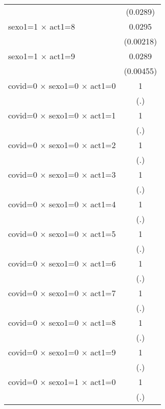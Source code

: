 {\begin{tabular}{l*{1}{c}}
                    &    (0.0289)         \\
[1em]
sexo1=1 $\times$ act1=8&      0.0295\sym{***}\\
                    &   (0.00218)         \\
[1em]
sexo1=1 $\times$ act1=9&      0.0289\sym{***}\\
                    &   (0.00455)         \\
[1em]
covid=0 $\times$ sexo1=0 $\times$ act1=0&           1         \\
                    &         (.)         \\
[1em]
covid=0 $\times$ sexo1=0 $\times$ act1=1&           1         \\
                    &         (.)         \\
[1em]
covid=0 $\times$ sexo1=0 $\times$ act1=2&           1         \\
                    &         (.)         \\
[1em]
covid=0 $\times$ sexo1=0 $\times$ act1=3&           1         \\
                    &         (.)         \\
[1em]
covid=0 $\times$ sexo1=0 $\times$ act1=4&           1         \\
                    &         (.)         \\
[1em]
covid=0 $\times$ sexo1=0 $\times$ act1=5&           1         \\
                    &         (.)         \\
[1em]
covid=0 $\times$ sexo1=0 $\times$ act1=6&           1         \\
                    &         (.)         \\
[1em]
covid=0 $\times$ sexo1=0 $\times$ act1=7&           1         \\
                    &         (.)         \\
[1em]
covid=0 $\times$ sexo1=0 $\times$ act1=8&           1         \\
                    &         (.)         \\
[1em]
covid=0 $\times$ sexo1=0 $\times$ act1=9&           1         \\
                    &         (.)         \\
[1em]
covid=0 $\times$ sexo1=1 $\times$ act1=0&           1         \\
                    &         (.)         \\
[1em]

\end{tabular}}
